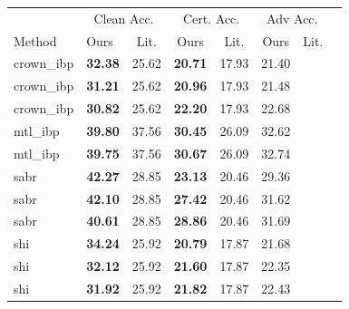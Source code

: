 \begin{tabular}{llcccccc}
\toprule
 & \multicolumn{2}{c}{Clean Acc.} & \multicolumn{2}{c}{Cert. Acc.} & \multicolumn{2}{c}{Adv Acc.} \\
Method & Ours & Lit. & Ours & Lit. & Ours & Lit. \\
\midrule
crown\_ibp & \textbf{32.38} & 25.62 & \textbf{20.71} & 17.93 & 21.40 & \\
crown\_ibp & \textbf{31.21} & 25.62 & \textbf{20.96} & 17.93 & 21.48 & \\
crown\_ibp & \textbf{30.82} & 25.62 & \textbf{22.20} & 17.93 & 22.68 & \\
mtl\_ibp & \textbf{39.80} & 37.56 & \textbf{30.45} & 26.09 & 32.62 & \\
mtl\_ibp & \textbf{39.75} & 37.56 & \textbf{30.67} & 26.09 & 32.74 & \\
sabr & \textbf{42.27} & 28.85 & \textbf{23.13} & 20.46 & 29.36 & \\
sabr & \textbf{42.10} & 28.85 & \textbf{27.42} & 20.46 & 31.62 & \\
sabr & \textbf{40.61} & 28.85 & \textbf{28.86} & 20.46 & 31.69 & \\
shi & \textbf{34.24} & 25.92 & \textbf{20.79} & 17.87 & 21.68 & \\
shi & \textbf{32.12} & 25.92 & \textbf{21.60} & 17.87 & 22.35 & \\
shi & \textbf{31.92} & 25.92 & \textbf{21.82} & 17.87 & 22.43 & \\
\bottomrule
\end{tabular}